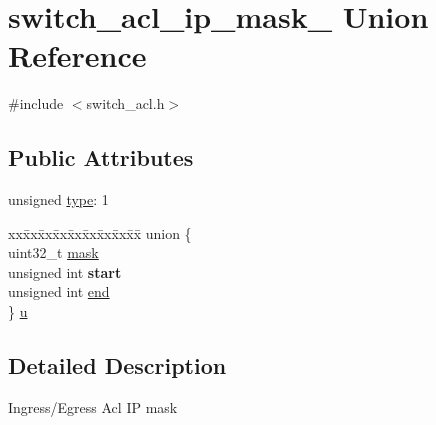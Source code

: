 \hypertarget{unionswitch__acl__ip__mask__}{\section{switch\+\_\+acl\+\_\+ip\+\_\+mask\+\_\+ Union Reference}
\label{unionswitch__acl__ip__mask__}
}


{\ttfamily \#include $<$switch\+\_\+acl.\+h$>$}

\subsection*{Public Attributes}
\begin{DoxyCompactItemize}
\item 
unsigned \hyperlink{unionswitch__acl__ip__mask___aaa4a09473f24932a646f12db7536e6fa}{type}\+: 1
\item 
\begin{tabbing}
xx\=xx\=xx\=xx\=xx\=xx\=xx\=xx\=xx\=\kill
union \{\\
\>uint32\_t \hyperlink{unionswitch__acl__ip__mask___a83ee753dcae5e72f95fab067092f1ca4}{mask}\\
\>unsigned int {\bfseries start}\\
\>unsigned int \hyperlink{unionswitch__acl__ip__mask___a2c7c173d9f4b2086daaf117a04acf83d}{end}\\
\} \hyperlink{unionswitch__acl__ip__mask___a53c715f04e56916d7bd4cb3a16eda123}{u}\\

\end{tabbing}\end{DoxyCompactItemize}


\subsection{Detailed Description}
Ingress/\+Egress Acl I\+P mask 

